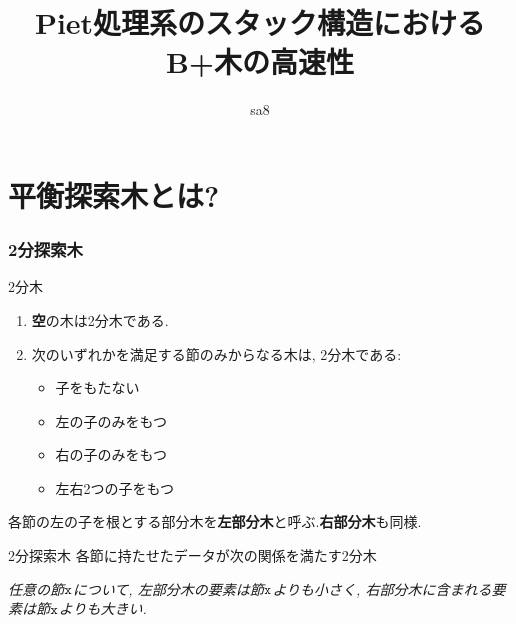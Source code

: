 \documentclass[10pt]{beamer}
\title{Piet処理系のスタック構造における\\B+木の高速性}
\author{sa8}
\begin{document}
\maketitle
\section{平衡探索木とは?}
\begin{frame}
    \frametitle{2分探索木}
    \begin{block}{2分木}
        \begin{enumerate}
            \item \textbf{空}の木は2分木である.
            \item 次のいずれかを満足する節のみからなる木は, 2分木である:
                  \begin{itemize}
                      \item 子をもたない
                      \item 左の子のみをもつ
                      \item 右の子のみをもつ
                      \item 左右2つの子をもつ
                  \end{itemize}
        \end{enumerate}
    \end{block}
    各節の左の子を根とする部分木を{\bf 左部分木}と呼ぶ.{\bf 右部分木}も同様.
    \begin{block}{2分探索木}
        各節に持たせたデータが次の関係を満たす2分木

        \textsl{任意の節$\tt x$について, 左部分木の要素は節$\tt x$よりも小さく,
            右部分木に含まれる要素は節$\tt x$よりも大きい.}
    \end{block}
\end{frame}
\end{document}
